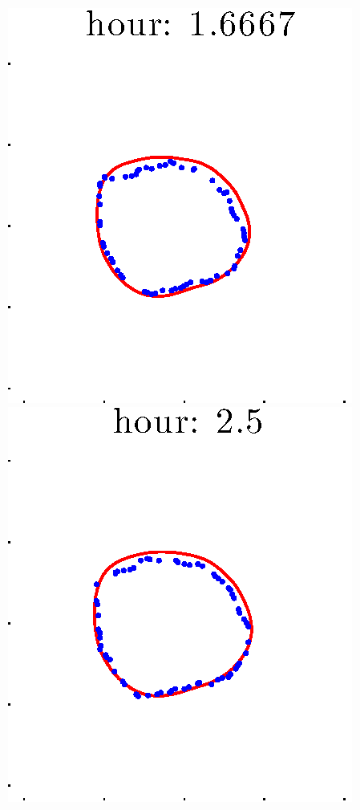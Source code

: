 \documentclass[12pt]{article}
\begin{document}
\begin{figure}[h!]
\begin{subfigure}[b]{.3\textwidth}
		\includegraphics[height=.15\textheight]{Pos5exp2/firsthalf/full3.eps}
		\includegraphics[height=.15\textheight]{Pos5exp2/firsthalf/full4.eps}

\end{subfigure}
\end{figure}
\end{document}
